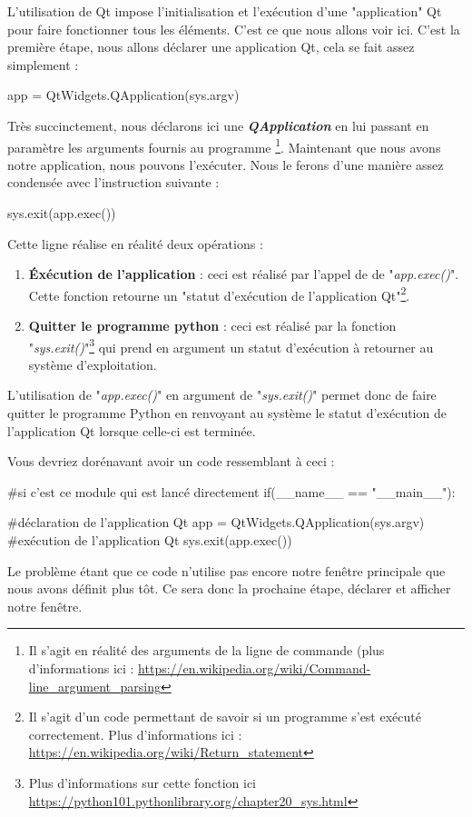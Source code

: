 \documentclass[12pt]{report}    %
\newcommand{\bold}[1]{{\bfseries #1}}
\newcommand{\italic}[1]{{\itshape #1}}
\newcommand{\ib}[1]{{\bfseries\itshape #1}}
\newcommand{\smallSkip}{\vskip 0.5cm}
\begin{document}
L'utilisation de Qt impose l'initialisation et l'exécution d'une "application" Qt pour faire fonctionner tous les éléments. C'est ce que nous allons voir ici.\newline
C'est la première étape, nous allons déclarer une application Qt, cela se fait assez simplement :
\begin{pyCode}
app = QtWidgets.QApplication(sys.argv)
\end{pyCode}
Très succinctement, nous déclarons ici une \ib{QApplication} en lui passant en paramètre les arguments fournis au programme
\footnote{Il s'agit en réalité des arguments de la ligne de commande (plus d'informations ici : \url{https://en.wikipedia.org/wiki/Command-line_argument_parsing}}.\newline
Maintenant que nous avons notre application, nous pouvons l'exécuter. Nous le ferons d'une manière assez condensée avec l'instruction suivante :
\begin{pyCode}
sys.exit(app.exec())
\end{pyCode}
Cette ligne réalise en réalité deux opérations :
\begin{enumerate}
    \item \bold{Éxécution de l'application} : ceci est réalisé par l'appel de de "\italic{app.exec()}". Cette fonction retourne un "statut d'exécution de l'application Qt"\footnote{Il s'agit d'un code permettant de savoir si un programme s'est exécuté correctement.\newline
    Plus d'informations ici : \url{https://en.wikipedia.org/wiki/Return_statement}}.
    
    \item \bold{Quitter le programme python} : ceci est réalisé par la fonction "\italic{sys.exit()}"\footnote{Plus d'informations sur cette fonction ici \url{https://python101.pythonlibrary.org/chapter20_sys.html}} qui prend en argument un statut d'exécution à retourner au système d'exploitation.
\end{enumerate}
L'utilisation de "\italic{app.exec()}" en argument de "\italic{sys.exit()}" permet donc de faire quitter le programme Python en renvoyant au système le statut d'exécution de l'application Qt lorsque celle-ci est terminée.\smallSkip

Vous devriez dorénavant avoir un code ressemblant à ceci :
\begin{pyCode}
#si c'est ce module qui est lancé directement
if(__name__ == "__main__"):

	#déclaration de l'application Qt
	app = QtWidgets.QApplication(sys.argv)
	#exécution de l'application Qt
	sys.exit(app.exec())
\end{pyCode}
Le problème étant que ce code n'utilise pas encore notre fenêtre principale que nous avons définit plus tôt.\newline
Ce sera donc la prochaine étape, déclarer et afficher notre fenêtre.
\end{document}
